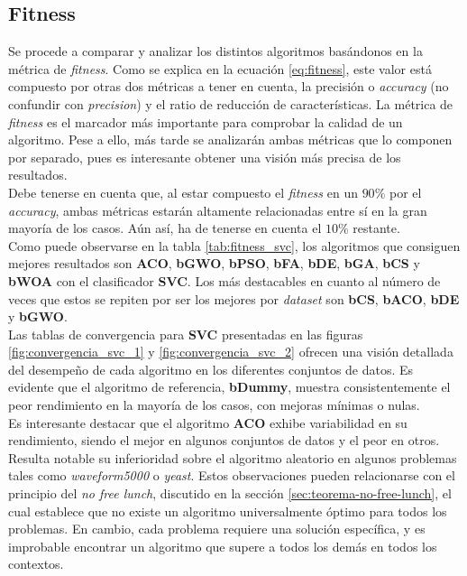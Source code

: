 \subsection{Fitness}
Se procede a comparar y analizar los distintos algoritmos basándonos en la métrica de \textit{fitness}. Como se explica en la ecuación \ref{eq:fitness}, este valor está compuesto por otras dos métricas a tener en cuenta, la precisión o \textit{accuracy} (no confundir con \textit{precision}) y el ratio de reducción de características. La métrica de \textit{fitness} es el marcador más importante para comprobar la calidad de un algoritmo. Pese a ello, más tarde se analizarán ambas métricas que lo componen por separado, pues es interesante obtener una visión más precisa de los resultados.\\[6pt]
Debe tenerse en cuenta que, al estar compuesto el \textit{fitness} en un $90\%$ por el \textit{accuracy}, ambas métricas estarán altamente relacionadas entre sí en la gran mayoría de los casos. Aún así, ha de tenerse en cuenta el $10\%$ restante.\\[6pt]
Como puede observarse en la tabla \ref{tab:fitness_svc}, los algoritmos que consiguen mejores resultados son \textbf{ACO}, \textbf{bGWO}, \textbf{bPSO}, \textbf{bFA}, \textbf{bDE}, \textbf{bGA}, \textbf{bCS} y \textbf{bWOA} con el clasificador \textbf{SVC}. Los más destacables en cuanto al número de veces que estos se repiten por ser los mejores por \textit{dataset} son \textbf{bCS}, \textbf{bACO}, \textbf{bDE} y \textbf{bGWO}.\\[6pt]

Las tablas de convergencia para \textbf{SVC} presentadas en las figuras \ref{fig:convergencia_svc_1} y \ref{fig:convergencia_svc_2} ofrecen una visión detallada del desempeño de cada algoritmo en los diferentes conjuntos de datos. Es evidente que el algoritmo de referencia, \textbf{bDummy}, muestra consistentemente el peor rendimiento en la mayoría de los casos, con mejoras mínimas o nulas.\\[6pt]
Es interesante destacar que el algoritmo \textbf{ACO} exhibe variabilidad en su rendimiento, siendo el mejor en algunos conjuntos de datos y el peor en otros. Resulta notable su inferioridad sobre el algoritmo aleatorio en algunos problemas tales como \textit{waveform5000} o \textit{yeast}. Estos observaciones pueden relacionarse con el principio del \textit{no free lunch}, discutido en la sección \ref{sec:teorema-no-free-lunch}, el cual establece que no existe un algoritmo universalmente óptimo para todos los problemas. En cambio, cada problema requiere una solución específica, y es improbable encontrar un algoritmo que supere a todos los demás en todos los contextos.

